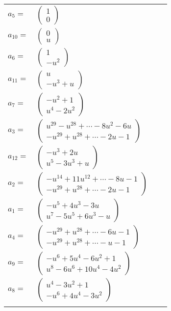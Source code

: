 \documentclass[1p]{elsarticle_modified}
\theoremstyle{definition}
\begin{document}
\begin{tabular}{m{7pt} m{180pt} m{7pt} m{180pt} }
\flushright $a_{5}=$&$\begin{pmatrix}1\\0\end{pmatrix}$ \\
\flushright $a_{10}=$&$\begin{pmatrix}0\\u\end{pmatrix}$ \\
\flushright $a_{6}=$&$\begin{pmatrix}1\\- u^2\end{pmatrix}$ \\
\flushright $a_{11}=$&$\begin{pmatrix}u\\- u^3+u\end{pmatrix}$ \\
\flushright $a_{7}=$&$\begin{pmatrix}- u^2+1\\u^4-2 u^2\end{pmatrix}$ \\
\flushright $a_{3}=$&$\begin{pmatrix}u^{29}- u^{28}+\cdots-8 u^2-6 u\\- u^{29}+u^{28}+\cdots-2 u-1\end{pmatrix}$ \\
\flushright $a_{12}=$&$\begin{pmatrix}- u^3+2 u\\u^5-3 u^3+u\end{pmatrix}$ \\
\flushright $a_{2}=$&$\begin{pmatrix}- u^{14}+11 u^{12}+\cdots-8 u-1\\- u^{29}+u^{28}+\cdots-2 u-1\end{pmatrix}$ \\
\flushright $a_{1}=$&$\begin{pmatrix}- u^5+4 u^3-3 u\\u^7-5 u^5+6 u^3- u\end{pmatrix}$ \\
\flushright $a_{4}=$&$\begin{pmatrix}- u^{29}+u^{28}+\cdots-6 u-1\\- u^{29}+u^{28}+\cdots- u-1\end{pmatrix}$ \\
\flushright $a_{9}=$&$\begin{pmatrix}- u^6+5 u^4-6 u^2+1\\u^8-6 u^6+10 u^4-4 u^2\end{pmatrix}$ \\
\flushright $a_{8}=$&$\begin{pmatrix}u^4-3 u^2+1\\- u^6+4 u^4-3 u^2\end{pmatrix}$\\&\end{tabular}
\end{document}
